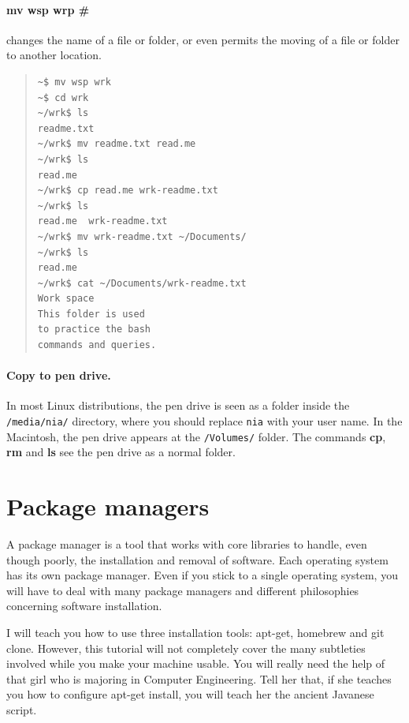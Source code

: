 \documentclass[a4paper,12pt,openany]{book}
\begin{document}
\paragraph{mv wsp wrp \#} changes
the name of a file or folder, or
even permits the moving of a file or
folder to another location.
\begin{quote}
\begin{verbatim}
~$ mv wsp wrk
~$ cd wrk
~/wrk$ ls
readme.txt
~/wrk$ mv readme.txt read.me
~/wrk$ ls
read.me
~/wrk$ cp read.me wrk-readme.txt
~/wrk$ ls
read.me  wrk-readme.txt
~/wrk$ mv wrk-readme.txt ~/Documents/
~/wrk$ ls
read.me
~/wrk$ cat ~/Documents/wrk-readme.txt
Work space
This folder is used
to practice the bash
commands and queries.
\end{verbatim}
\end{quote}

\paragraph{Copy to pen drive.}
In most Linux distributions, the pen drive is
seen as a folder inside the \verb|/media/nia/|
directory, where you should replace \verb|nia|
with your user name. In the Macintosh, the
pen drive appears at the \verb|/Volumes/| folder.
The commands {\bf cp}, {\bf rm} and {\bf ls}
see the pen drive as a normal folder.


\section{Package managers}\label{sec:packages}
A package
manager is a tool that works with
core libraries to handle, even though poorly,
the installation and removal of
software. Each operating system has its own
package manager. Even if you stick to a single
operating system, you will have to
deal with many package managers
and different philosophies concerning
software installation.


I will teach you how to use three
installation tools: apt-get,
homebrew and git clone. However,
this tutorial will not
completely cover the many subtleties
involved while you make your machine usable.
You will really need the help of
that girl who is majoring in
Computer Engineering.
Tell her that, if she teaches you
how to configure apt-get install,
you will teach her the ancient
Javanese script.
\end{document}
